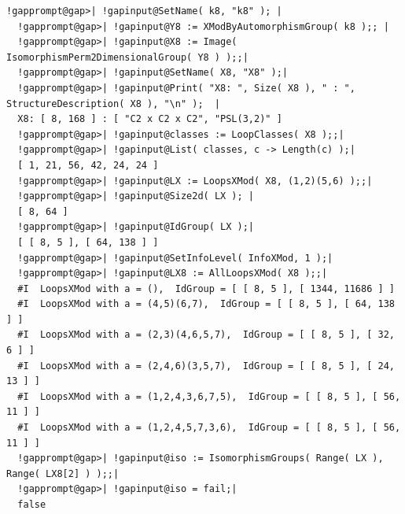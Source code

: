 \documentclass[a4paper,11pt]{report}
\begin{document}
{{\begin{Verbatim}[commandchars=!@|,fontsize=\small,frame=single,label=Example]
  !gapprompt@gap>| !gapinput@SetName( k8, "k8" ); |
  !gapprompt@gap>| !gapinput@Y8 := XModByAutomorphismGroup( k8 );; |
  !gapprompt@gap>| !gapinput@X8 := Image( IsomorphismPerm2DimensionalGroup( Y8 ) );;|
  !gapprompt@gap>| !gapinput@SetName( X8, "X8" );|
  !gapprompt@gap>| !gapinput@Print( "X8: ", Size( X8 ), " : ", StructureDescription( X8 ), "\n" );  |
  X8: [ 8, 168 ] : [ "C2 x C2 x C2", "PSL(3,2)" ]
  !gapprompt@gap>| !gapinput@classes := LoopClasses( X8 );;|
  !gapprompt@gap>| !gapinput@List( classes, c -> Length(c) );|
  [ 1, 21, 56, 42, 24, 24 ]
  !gapprompt@gap>| !gapinput@LX := LoopsXMod( X8, (1,2)(5,6) );;|
  !gapprompt@gap>| !gapinput@Size2d( LX ); |
  [ 8, 64 ]
  !gapprompt@gap>| !gapinput@IdGroup( LX );|
  [ [ 8, 5 ], [ 64, 138 ] ]
  !gapprompt@gap>| !gapinput@SetInfoLevel( InfoXMod, 1 );|
  !gapprompt@gap>| !gapinput@LX8 := AllLoopsXMod( X8 );;|
  #I  LoopsXMod with a = (),  IdGroup = [ [ 8, 5 ], [ 1344, 11686 ] ]
  #I  LoopsXMod with a = (4,5)(6,7),  IdGroup = [ [ 8, 5 ], [ 64, 138 ] ]
  #I  LoopsXMod with a = (2,3)(4,6,5,7),  IdGroup = [ [ 8, 5 ], [ 32, 6 ] ]
  #I  LoopsXMod with a = (2,4,6)(3,5,7),  IdGroup = [ [ 8, 5 ], [ 24, 13 ] ]
  #I  LoopsXMod with a = (1,2,4,3,6,7,5),  IdGroup = [ [ 8, 5 ], [ 56, 11 ] ]
  #I  LoopsXMod with a = (1,2,4,5,7,3,6),  IdGroup = [ [ 8, 5 ], [ 56, 11 ] ]
  !gapprompt@gap>| !gapinput@iso := IsomorphismGroups( Range( LX ), Range( LX8[2] ) );;|
  !gapprompt@gap>| !gapinput@iso = fail;|
  false
  
\end{Verbatim}
 }

 }

         
\end{document}
